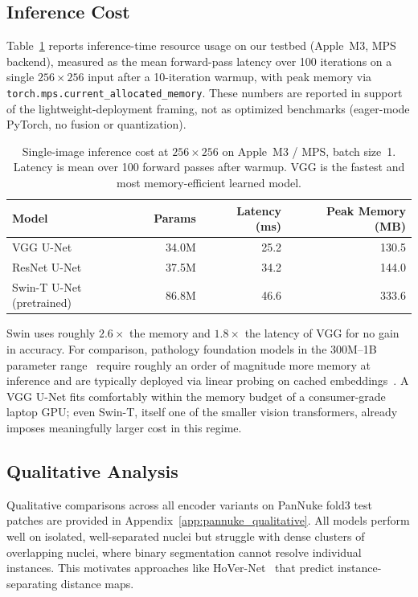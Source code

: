 \documentclass{article}
\begin{document}
\subsection{Inference Cost}
\label{sec:inference_cost}

Table~\ref{tab:inference_cost} reports inference-time resource usage on our testbed (Apple~M3, MPS backend), measured as the mean forward-pass latency over 100 iterations on a single $256\times256$ input after a 10-iteration warmup, with peak memory via \texttt{torch.mps.current\_allocated\_memory}. These numbers are reported in support of the lightweight-deployment framing, not as optimized benchmarks (eager-mode PyTorch, no fusion or quantization).

\begin{table}[h]
\centering
\caption{Single-image inference cost at $256\times256$ on Apple~M3 / MPS, batch size~1. Latency is mean over 100 forward passes after warmup. VGG is the fastest and most memory-efficient learned model.}
\label{tab:inference_cost}
\small
\begin{tabular}{@{}lrrr@{}}
\toprule
\textbf{Model} & \textbf{Params} & \textbf{Latency (ms)} & \textbf{Peak Memory (MB)} \\
\midrule
VGG U-Net & 34.0M & 25.2 & 130.5 \\
ResNet U-Net & 37.5M & 34.2 & 144.0 \\
Swin-T U-Net (pretrained) & 86.8M & 46.6 & 333.6 \\
\bottomrule
\end{tabular}
\end{table}

Swin uses roughly $2.6\times$ the memory and $1.8\times$ the latency of VGG for no gain in accuracy. For comparison, pathology foundation models in the 300M--1B parameter range~\cite{chen2024uni, vorontsov2024virchow} require roughly an order of magnitude more memory at inference and are typically deployed via linear probing on cached embeddings~\cite{tizhoosh2025why, campanella2025clinical}. A VGG U-Net fits comfortably within the memory budget of a consumer-grade laptop GPU; even Swin-T, itself one of the smaller vision transformers, already imposes meaningfully larger cost in this regime.

\subsection{Qualitative Analysis}

Qualitative comparisons across all encoder variants on PanNuke fold3 test patches are provided in Appendix~\ref{app:pannuke_qualitative}. All models perform well on isolated, well-separated nuclei but struggle with dense clusters of overlapping nuclei, where binary segmentation cannot resolve individual instances. This motivates approaches like HoVer-Net~\cite{graham2019hovernet} that predict instance-separating distance maps.
\end{document}
